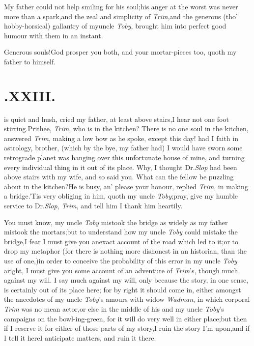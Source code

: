 \documentclass{article}
\begin{document}
My father could not help smiling for his soul;\tsk his anger at
the worst was ne\-ver more than a spark,\tsk and the zeal and
simplicity of \textit{Trim},\tsh and the generous
(tho’ hobby-horsical) gallantry of my\break uncle \textit{Toby},
brought him into perfect good humour with them in an instant.

Generous souls!\tsk God prosper you both, and your mortar-pieces
too, quoth my father to himself.

\section{.\quad  XXIII.}

 is quiet and hush, cried my\break
father, at least above stairs,\tsk I\break
hear not one foot stirring.\tsh Prithee, \textit{Trim}, who is in
the kitchen?  There is no one soul in the kitchen, answered
\textit{Trim}, making a low bow as he spoke, except
this day! had I faith in astrology, bro\-ther, (which by
the bye, my father had)
I would have sworn some retrograde pla\-net was hanging over this
unfortunate house of mine, and turning every individual thing in
it out of its place.\tsh\break
Why, I thought Dr.\@ \textit{Slop} had been above stairs with my
wife, and so said you.\tsh\break
What can the fellow be puzzling about
in the kitchen?\tsk He is busy, an’ please your honour, replied
\textit{Trim}, in making a bridge.\tsh ’Tis very obliging in
him, quoth my uncle \textit{Toby};\tsh pray, give my humble
service to Dr.\@ \textit{Slop}, \textit{Trim}, and tell him I
thank him heartily.

You must know, my uncle \textit{Toby} mistook the bridge as
widely as my father mistook the mortars;\tsh but to
under\-stand how my uncle \textit{Toby} could mistake the
bridge,\tsk I fear I must give you an\break exact account of the road
which led to it;\tsk or to drop my metaphor (for
there is nothing more dishonest in an historian, than the use of
one,)\tsh in order to conceive the probability of this error in
my uncle \textit{Toby} aright, I must give you some account of
an adventure of \textit{Trim}’s, though much against my will. I
say much against my will, only because the story, in one sense,
is certainly out of its place here; for by right it should come
in, either amongst the anecdotes of my uncle \textit{Toby}’s
amours with widow \textit{Wadman}, in which corporal
\textit{Trim} was no mean actor,\tsk or else in the middle of his
and my uncle \textit{Toby}’s campaigns on the bowl-\break ing-green,\tsk
for it will do very well in either place;\tsk but then if I
reserve it for either of those parts of my story,\tsh I ruin the
story I’m upon,\tsk and if I tell it here\tsk I anticipate
matters, and ruin it there.
\end{document}
